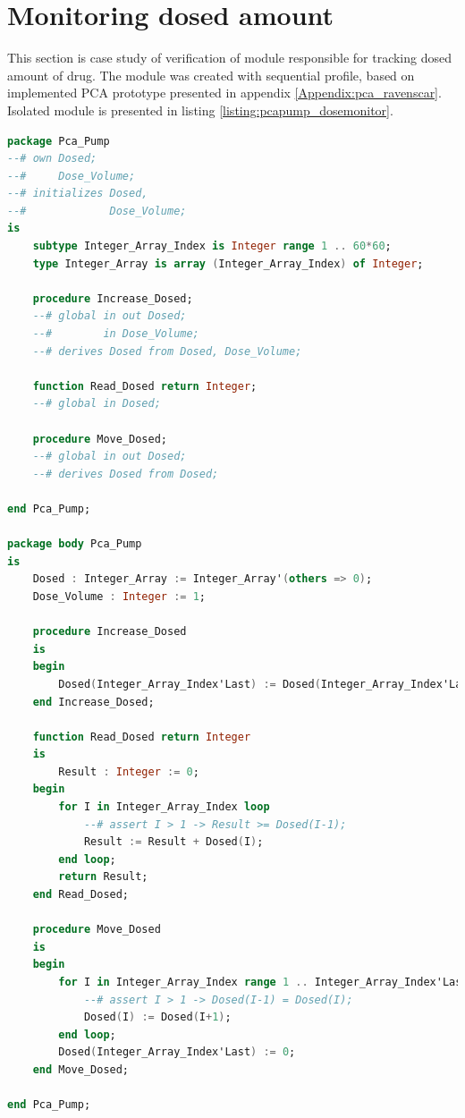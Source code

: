 \section{Monitoring dosed amount}
\label{verification:pcapump:monitoring}

This section is case study of verification of module responsible for tracking dosed amount of drug. The module was created with sequential profile, based on implemented PCA prototype presented in appendix \ref{Appendix:pca_ravenscar}. Isolated module is presented in listing \ref{listing:pcapump_dosemonitor}.

\singlespacing
\begin{lstlisting}[language=ada, frame=single, gobble=0, caption={Dose monitor module specification}]
package Pca_Pump
--# own Dosed;
--#     Dose_Volume;
--# initializes Dosed,
--#             Dose_Volume;
is
    subtype Integer_Array_Index is Integer range 1 .. 60*60;
    type Integer_Array is array (Integer_Array_Index) of Integer;

    procedure Increase_Dosed;
    --# global in out Dosed;
    --#        in Dose_Volume;
    --# derives Dosed from Dosed, Dose_Volume;

    function Read_Dosed return Integer;
    --# global in Dosed;

    procedure Move_Dosed;
    --# global in out Dosed;
    --# derives Dosed from Dosed;

end Pca_Pump;

package body Pca_Pump
is
    Dosed : Integer_Array := Integer_Array'(others => 0);
    Dose_Volume : Integer := 1;

    procedure Increase_Dosed
    is
    begin
        Dosed(Integer_Array_Index'Last) := Dosed(Integer_Array_Index'Last) + Dose_Volume;
    end Increase_Dosed;

    function Read_Dosed return Integer
    is
        Result : Integer := 0;
    begin
        for I in Integer_Array_Index loop
            --# assert I > 1 -> Result >= Dosed(I-1);
            Result := Result + Dosed(I);
        end loop;
        return Result;
    end Read_Dosed;

    procedure Move_Dosed
    is
    begin
        for I in Integer_Array_Index range 1 .. Integer_Array_Index'Last-1 loop
            --# assert I > 1 -> Dosed(I-1) = Dosed(I);
            Dosed(I) := Dosed(I+1);
        end loop;
        Dosed(Integer_Array_Index'Last) := 0;
    end Move_Dosed;

end Pca_Pump;
\end{lstlisting}
\label{listing:pcapump_dosemonitor}
\doublespacing

